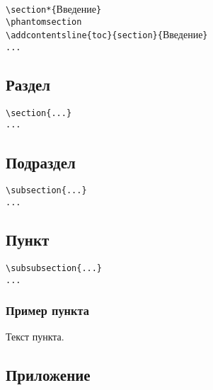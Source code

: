 \documentclass[14pt, a4paper, titlepage]{extarticle}
\renewcommand{\thesection}{\Asbuk{section}}
\let\oldsec\section
\renewcommand{\section}{
        \clearpage
        \phantomsection
        \refstepcounter{section}
        \addcontentsline{toc}{section}{\appendixname~\thesection}
        \oldsec*} %
\begin{document}
\noindent\verb"\section*{"Введение\verb"}"\\
\verb"\phantomsection"\\
\verb"\addcontentsline{toc}{section}{"Введение\verb"}"\\
\verb"..."

\subsection{Раздел}

\begin{verbatim}
\section{...}
...
\end{verbatim}

\subsection{Подраздел}

\begin{verbatim}
\subsection{...}
...
\end{verbatim}

\subsection{Пункт}

\begin{verbatim}
\subsubsection{...}
...
\end{verbatim}

\subsubsection{Пример пункта}

Текст пункта.

\subsection{Приложение}
\end{document}
